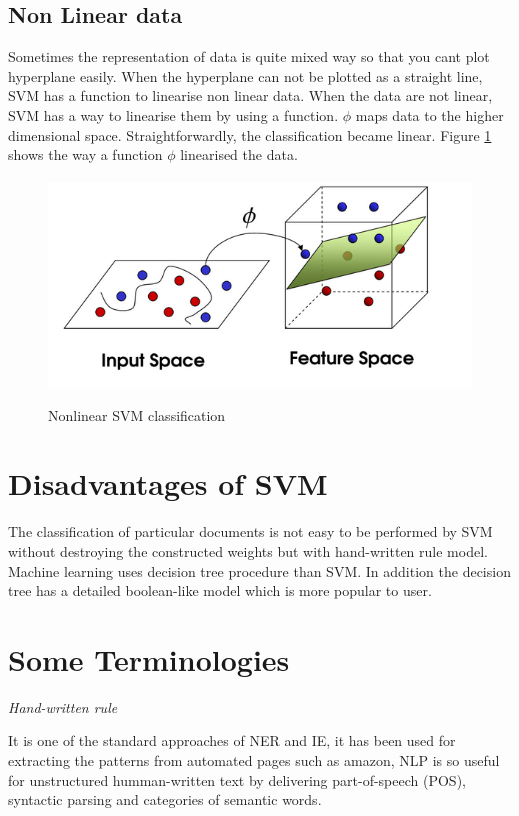 \subsection{Non Linear data} 
Sometimes the representation of data is quite mixed way so that you cant plot hyperplane easily. When the hyperplane can not be plotted as a straight line,  SVM has a function to linearise non linear data.  When the data are not linear, SVM has a way to linearise them by using a function. $ \phi$ maps data to the higher dimensional space. Straightforwardly, the classification became linear. Figure \ref{SVMNL} shows the way a function $ \phi$ linearised the data.

\begin{figure}[hbtp]
\caption{Nonlinear SVM classification}
\centering
\includegraphics[scale=.7]{images/SVMNL.png}\label{SVMNL}
\end{figure}
 
\section{Disadvantages of SVM} 
The classification of particular documents is not easy to be performed by SVM without destroying the constructed weights  but with hand-written rule model. Machine learning uses decision tree procedure than SVM. In addition the decision tree has a detailed boolean-like  model which is more popular to user.

\section{Some Terminologies}

\textit{Hand-written rule}

It is one of the standard approaches of NER and IE, it has been used for extracting the patterns from automated pages such as amazon, NLP is so useful for unstructured humman-written text by delivering  part-of-speech (POS), syntactic parsing and categories of semantic words.

